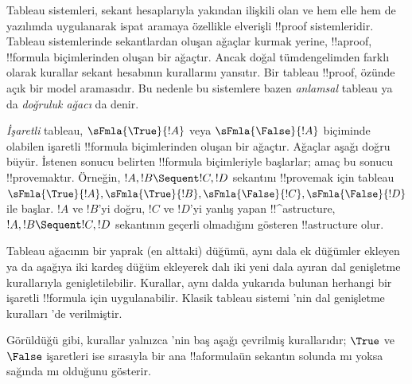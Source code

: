 \documentclass[../../../include/open-logic-section]{subfiles}
\begin{document}


Tableau sistemleri, sekant hesaplarıyla yakından ilişkili olan ve hem
elle hem de yazılımda uygulanarak ispat aramaya özellikle elverişli
!!{proof} sistemleridir. Tableau sistemlerinde sekantlardan oluşan ağaçlar
kurmak yerine, !!a{proof}, !!{formula} biçimlerinden oluşan bir ağaçtır. Ancak
doğal tümdengelimden farklı olarak kurallar sekant hesabının kurallarını
yansıtır. Bir tableau !!{proof}, özünde açık bir model aramasıdır. Bu
nedenle bu sistemlere bazen \emph{anlamsal} tableau ya da \emph{doğruluk
ağacı} da denir.

\emph{İşaretli} tableau, $\sFmla{\True}{!A}$ veya
$\sFmla{\False}{!A}$ biçiminde olabilen işaretli !!{formula} biçimlerinden
oluşan bir ağaçtır. Ağaçlar aşağı doğru büyür. İstenen sonucu belirten
!!{formula} biçimleriyle başlarlar; amaç bu sonucu !!{prove}{}maktır. Örneğin,
$!A, !B \Sequent !C, !D$ sekantını !!{prove}{}mak için tableau
$\sFmla{\True}{!A}, \sFmla{\True}{!B},
\sFmla{\False}{!C}, \sFmla{\False}{!D}$ ile başlar.
$!A$ ve $!B$'yi doğru, $!C$ ve $!D$'yi yanlış yapan !!^a{structure},
$!A, !B \Sequent !C, !D$ sekantının geçerli olmadığını gösteren
!!a{structure} olur.

Tableau ağacının bir yaprak (en alttaki) düğümü, aynı dala ek düğümler
ekleyen ya da aşağıya iki kardeş düğüm ekleyerek dalı iki yeni dala
ayıran dal genişletme kurallarıyla genişletilebilir. Kurallar, aynı
dalda yukarıda bulunan herhangi bir işaretli !!{formula} için
uygulanabilir. Klasik tableau sistemi 'nin dal genişletme
kuralları 'de verilmiştir.



Görüldüğü gibi, kurallar yalnızca 'nin baş aşağı çevrilmiş
kurallarıdır; $\True$ ve $\False$ işaretleri ise sırasıyla bir
ana !!a{formula}{}ün sekantın solunda mı yoksa sağında mı
olduğunu gösterir.
\end{document}
